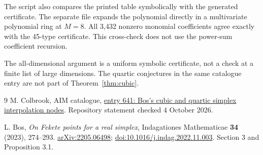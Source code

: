 \documentclass[11pt,a4paper]{article}
\theoremstyle{remark}
\begin{document}
The script  also compares the printed table symbolically with the generated certificate. The separate file  expands the polynomial directly in a multivariate polynomial ring at $M=8$. All 3,432 nonzero monomial coefficients agree exactly with the 45-type certificate. This cross-check does not use the power-sum coefficient recursion.

The all-dimensional argument is a uniform symbolic certificate, not a check at a finite list of large dimensions. The quartic conjectures in the same catalogue entry are not part of Theorem~\ref{thm:cubic}.

\begin{thebibliography}{9}
M. Colbrook, AIM catalogue, \href{https://github.com/MColbrook/AIM/blob/59a8f0c2957dd272f56bcf282dfe0c066a15f441/problems/641-bos-simplex-interpolation-nodes.md}{entry 641: Bos's cubic and quartic simplex interpolation nodes}. Repository statement checked 4 October 2026.

L. Bos, \emph{On Fekete points for a real simplex}, Indagationes Mathematicae \textbf{34} (2023), 274--293. \href{https://arxiv.org/abs/2205.06498}{arXiv:2205.06498}; \href{https://doi.org/10.1016/j.indag.2022.11.003}{doi:10.1016/j.indag.2022.11.003}. Section 3 and Proposition 3.1.
\end{thebibliography}
\end{document}
